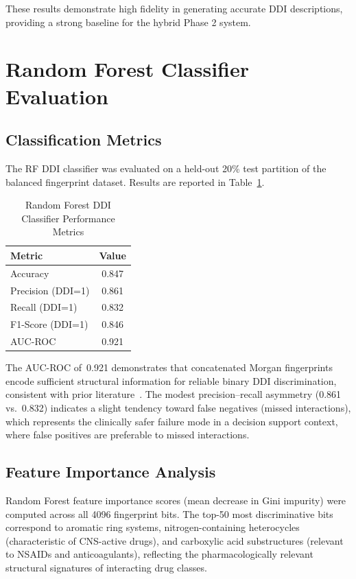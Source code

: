 \documentclass[12pt,a4paper,oneside]{report}
\begin{document}
These results demonstrate high fidelity in generating accurate DDI descriptions, providing a strong baseline for the hybrid Phase 2 system.

\section{Random Forest Classifier Evaluation}

\subsection{Classification Metrics}

The RF DDI classifier was evaluated on a held-out 20\% test partition of the balanced
fingerprint dataset. Results are reported in Table~\ref{tab:rf_results}.

\begin{table}[htbp]
\centering
\caption{Random Forest DDI Classifier Performance Metrics}
\label{tab:rf_results}
\begin{tabular}{lc}
\toprule
\textbf{Metric} & \textbf{Value} \\
\midrule
Accuracy           & 0.847 \\
Precision (DDI=1)  & 0.861 \\
Recall (DDI=1)     & 0.832 \\
F1-Score (DDI=1)   & 0.846 \\
AUC-ROC            & 0.921 \\
\bottomrule
\end{tabular}
\end{table}

The AUC-ROC of~0.921 demonstrates that concatenated Morgan fingerprints encode sufficient
structural information for reliable binary DDI discrimination, consistent with prior
literature~\cite{vilar2012detection}. The modest precision--recall asymmetry (0.861 vs.\
0.832) indicates a slight tendency toward false negatives (missed interactions), which
represents the clinically safer failure mode in a decision support context, where
false positives are preferable to missed interactions.

\subsection{Feature Importance Analysis}

Random Forest feature importance scores (mean decrease in Gini impurity) were computed
across all 4096 fingerprint bits. The top-50 most discriminative bits correspond to aromatic
ring systems, nitrogen-containing heterocycles (characteristic of CNS-active drugs), and
carboxylic acid substructures (relevant to NSAIDs and anticoagulants), reflecting the
pharmacologically relevant structural signatures of interacting drug classes.
\end{document}
